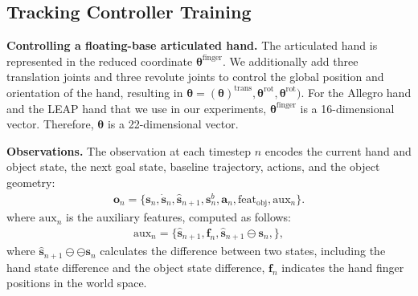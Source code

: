 \subsection{Tracking Controller Training} \label{sec:supp_method_tracking_controller_train}




\noindent\textbf{Controlling a floating-base articulated hand.} The articulated hand is represented in the reduced coordinate $\mathbf{\theta}^{\text{finger}}$. We additionally add three translation joints and three revolute joints to control the global position and orientation of the hand, resulting in $\mathbf{\theta} = (\mathbf{\theta})^{\text{trans}}, \mathbf{\theta}^{\text{rot}}, \mathbf{\theta}^{\text{rot}})$. For the Allegro hand and the LEAP hand that we use in our experiments, $\mathbf{\theta}^{\text{finger}}$  is a 16-dimensional vector. Therefore, $\mathbf{\theta}$ is a 22-dimensional vector. 



\noindent\textbf{Observations.} 
The observation at each timestep $n$ encodes the current hand and object state, the next goal state, baseline trajectory, actions, and the object geometry: 
\begin{align}
    \mathbf{o}_n = \{ \mathbf{s}_n, \dot{\mathbf{s}}_n,  \hat{\mathbf{s}}_{n+1}, \mathbf{s}^b_n, \mathbf{a}_n, \text{feat}_{\text{obj}}, \text{aux}_n \}. \label{eq_obs}
\end{align}
where $\text{aux}_n$ is the auxiliary features, computed as follows:
\begin{align}
    \text{aux}_n = \{ \hat{\mathbf{s}}_{n+1}, \mathbf{f}_n, \hat{\mathbf{s}}_{n+1} \ominus {\mathbf{s}}_n,    \}, \label{eq:observations_aux}
\end{align}
where $\hat{\mathbf{s}}_{n+1}\ominus \ominus {\mathbf{s}}_n$  calculates the difference between two states, including the hand state difference and the object state difference, $\mathbf{f}_n$ indicates the hand finger positions in the world space.




